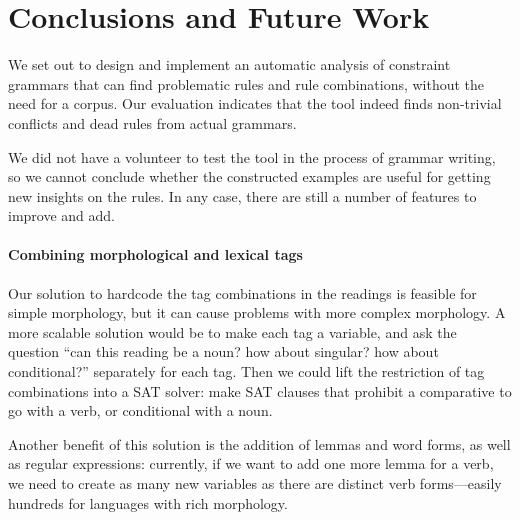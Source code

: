 



\section{Conclusions and Future Work}
\label{sec:conclusion}

We set out to design and implement an automatic analysis of constraint grammars that can find problematic rules and rule combinations, without the need for a corpus.
Our evaluation indicates that the tool indeed finds non-trivial conflicts and dead rules
from actual grammars. 

We did not have a volunteer to test the tool in
the process of grammar writing, so we cannot conclude whether the
constructed examples are useful for getting new insights on the rules.
In any case, there are still a number of features to improve and add.

\paragraph{Combining morphological and lexical tags}

Our solution to hardcode the tag combinations in the readings is
feasible for simple morphology, but it can cause problems with more
complex morphology.
A more scalable solution would be to make each tag a variable, and ask the
question ``can this reading be a noun? how about singular? how about
conditional?'' separately for each tag. Then we could lift the
restriction of tag combinations into a SAT solver: make SAT clauses
that prohibit a comparative to go with a verb, or conditional with a noun.

Another benefit of this solution is the addition of lemmas and word
forms, as well as regular expressions: currently, if we want to add
one more lemma for a verb, we need to create as many new variables as
there are distinct verb forms---easily hundreds for languages with
rich morphology.

